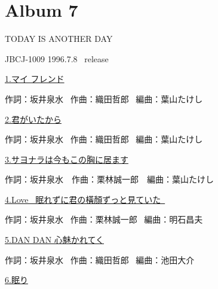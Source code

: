 
\chapter{Album 7}
\thispagestyle{empty} %
\vspace{-16mm}
\LARGE {TODAY IS ANOTHER DAY}

\normalsize{JBCJ-1009 1996.7.8 \ release}
\\

\vspace{-5mm}


\small{\hyperlink{7_0}{1.マイ フレンド}}

\tiny{作詞：坂井泉水 \ 作曲：織田哲郎 \ 編曲：葉山たけし}

\small{\hyperlink{7_1}{2.君がいたから}}

\tiny{作詞：坂井泉水 \ 作曲：織田哲郎 \ 編曲：葉山たけし}

\small{\hyperlink{7_2}{3.サヨナラは今もこの胸に居ます}}

\tiny{作詞：坂井泉水　作曲：栗林誠一郎　編曲：葉山たけし}

\small{\hyperlink{7_3}{4.Love ~眠れずに君の橫顏ずっと見ていた~}}

\tiny{作詞：坂井泉水 \ 作曲：栗林誠一郎 \ 編曲：明石昌夫}

\small{\hyperlink{7_4}{5.DAN DAN 心魅かれてく}}

\tiny{作詞：坂井泉水 \ 作曲：織田哲郎 \ 編曲：池田大介}

\small{\hyperlink{7_5}{6.眠り}}

